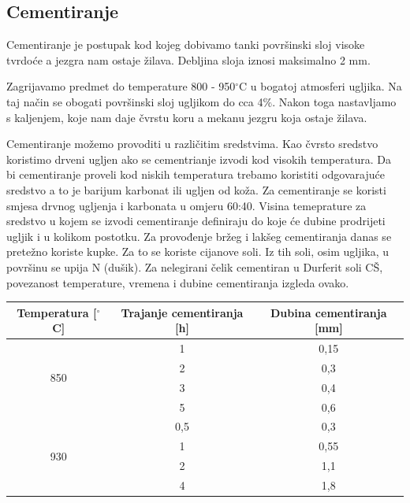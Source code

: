 \documentclass[a4paper,12pt]{article}
\numberwithin{figure}{section}
\begin{document}
\subsection{Cementiranje}
Cementiranje je postupak kod kojeg dobivamo tanki površinski sloj visoke tvrdoće a jezgra nam ostaje žilava. Debljina sloja iznosi maksimalno 2 mm. \par
Zagrijavamo predmet do temperature 800 - 950$^{\circ}$C u bogatoj atmosferi ugljika. Na taj način se obogati površinski sloj ugljikom do cca 4$\%$. Nakon toga nastavljamo s kaljenjem, koje nam daje čvrstu koru a mekanu jezgru koja ostaje žilava.\par
Cementiranje možemo provoditi u različitim sredstvima. Kao čvrsto sredstvo koristimo drveni ugljen ako se cementrianje izvodi kod visokih temperatura. Da bi cementiranje proveli kod niskih temperatura trebamo koristiti odgovarajuće sredstvo a to je barijum karbonat ili ugljen od koža. Za cementiranje se koristi smjesa drvnog ugljenja i karbonata u  omjeru 60:40. Visina temeprature za sredstvo u kojem se izvodi cementiranje definiraju do koje će dubine prodrijeti ugljik i u kolikom postotku. Za provođenje bržeg i lakšeg cementiranja danas se pretežno koriste kupke. Za to se koriste cijanove soli. Iz tih soli, osim ugljika, u površinu se upija N (dušik). Za nelegirani čelik cementiran u Durferit soli CŠ, povezanost temperature, vremena i dubine cementiranja izgleda ovako.
\begin{table}[!h]
\centering
\label{my-label}
\begin{tabular}{|c|c|c|}
\hline
Temperatura {[}$^{\circ}$C{]}   & Trajanje cementiranja {[}h{]} & Dubina cementiranja {[}mm{]} \\ \hline
\multirow{4}{*}{850} & 1                             & 0,15                         \\
                     & 2                             & 0,3                          \\
                     & 3                             & 0,4                          \\
                     & 5                             & 0,6                          \\ \hline
\multirow{4}{*}{930} & 0,5                           & 0,3                          \\
                     & 1                             & 0,55                         \\
                     & 2                             & 1,1                          \\
                     & 4                             & 1,8                         \\ \hline
\end{tabular}
\end{table}
\end{document}
